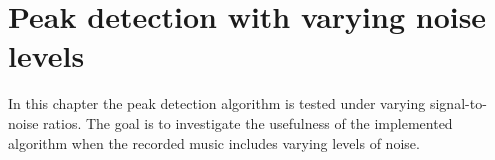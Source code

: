 \chapter{Peak detection with varying noise levels} \label{ch11}
In this chapter the peak detection algorithm is tested under varying signal-to-noise ratios. The goal is to investigate the usefulness of the implemented algorithm when the recorded music includes varying levels of noise.
